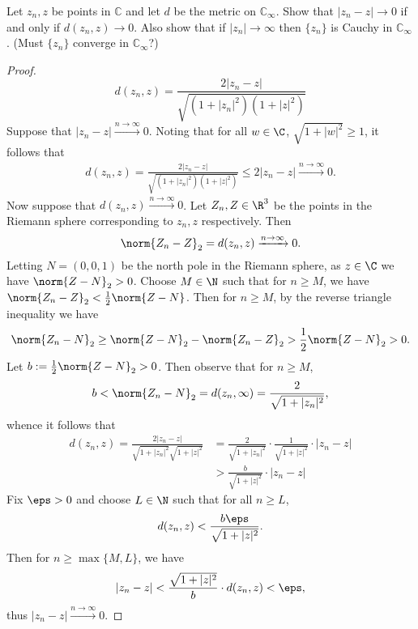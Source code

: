 \documentclass[12pt]{article}
\begin{document}
\begin{homeworkProblem}
  Let $z_n, z$ be points in $\mathbb{C}$ and let $d$ be the metric on $\mathbb{C}_\infty$.  
  Show that $\lvert z_n - z \rvert \to 0$ if and only if $d(z_n, z) \to 0$.  
  Also show that if $\lvert z_n \rvert \to \infty$ then $\{z_n\}$ is Cauchy in $\mathbb{C}_\infty$.  
  (Must $\{z_n\}$ converge in $\mathbb{C}_\infty$?)

  \begin{proof}
    \[
      d(z_{n},z) = \frac{2|z_{n}-z|}{\sqrt{(1+|z_{n}|^{2})(1+|z|^{2})}}
    \]
    Suppose that $ |z_{n}-z|\xrightarrow{n\to \infty}0 $. Noting that for all $ w\in \C $, $ \sqrt{1+|w|^{2}}\geq 1 $, it follows that 
    \begin{align*}
      d(z_{n},z) = \frac{2|z_{n}-z|}{\sqrt{(1+|z_{n}|^{2})(1+|z|^{2})}} \leq 2|z_{n}-z|\xrightarrow{n\to\infty}0.
    \end{align*}
    Now suppose that $ d(z_{n},z) \xrightarrow{n\to\infty}0 $. Let $ Z_{n}, Z\in \R^{3} $ be the points in the Riemann sphere corresponding to $ z_{n},z $ respectively. Then 
    \[
      \norm{Z_{n}-Z}_{2} = d(z_{n},z)\xrightarrow{n\to\infty}0.
    \]
    Letting $ N=(0,0,1) $ be the north pole in the Riemann sphere,  as $ z\in \C $ we have $ \norm{Z-N}_{2} >0 $. Choose $ M\in \N $ such that for $ n\geq M $, we have $ \norm{Z_{n}-Z}_{2} < \frac{1}{2}\norm{Z-N} $. Then for $ n\geq M $, by the reverse triangle inequality we have
    \[
      \norm{Z_{n}-N}_{2} \geq \norm{Z-N}_{2}- \norm{Z_{n}-Z}_{2} > \frac{1}{2}\norm{Z-N}_{2} >0.
    \]
    Let $ b:= \frac{1}{2}\norm{Z-N}_{2}>0 $. Then observe that for $ n\geq M $, 
    \[
      b< \norm{Z_{n}-N}_{2} = d(z_{n},\infty) = \frac{2}{\sqrt{1+|z_{n}|^2}},
    \]
    whence it follows that 
    \begin{align*}
      d(z_{n},z) = \frac{2|z_{n}-z|}{\sqrt{1+|z_{n}|^{2}}\sqrt{1+|z|^{2}}} &= \frac{2}{\sqrt{1+|z_{n}|^{2}}}\cdot \frac{1}{\sqrt{1+|z|^{2}}} \cdot |z_{n}-z|\\
      &>\frac{b}{\sqrt{1+|z|^{2}}}\cdot |z_{n}-z|
    \end{align*}
    Fix $ \eps>0 $ and choose $ L\in\N $ such that for all $ n\geq L $, 
    \[
      d(z_{n},z) < \frac{b \eps}{\sqrt{1+|z|^{2}}}.
    \]
    Then for $ n\geq \max\{M,L\} $, we have 
    \[
      |z_{n}-z| < \frac{\sqrt{1+|z|^{2}}}{b}\cdot d(z_{n},z) < \eps,
    \]
    thus $ |z_{n}-z|\xrightarrow{n\to \infty}0 $.
  \end{proof}
\end{homeworkProblem}
\end{document}
